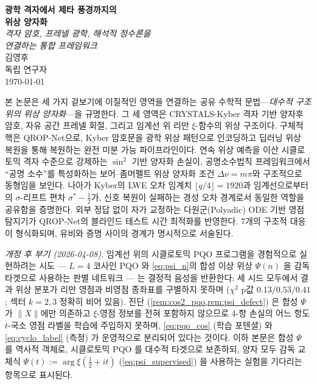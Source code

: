 \documentclass[11pt, a4paper]{article}
\theoremstyle{definition}
\theoremstyle{plain}
\newcommand{\xif}{\xi}
\newcommand{\Psip}{\Psi}
\begin{document}
\begin{center}
  {\LARGE\bfseries 광학 격자에서 제타 풍경까지의\\[4pt]
   위상 양자화}\\[14pt]
  {\large\itshape 격자 암호, 프레넬 광학, 해석적 정수론을\\
   연결하는 통합 프레임워크}\\[20pt]
  {\large 김영후}\\[4pt]
  {\normalsize 독립 연구자}\\[4pt]
  {\small\today}
\end{center}

\vspace{1.5em}

\begin{tcolorbox}[
  colback=lightbg, colframe=zetaviolet!60!black,
  title={\bfseries 초록}, fonttitle=\large,
  arc=3pt, boxrule=0.8pt, toptitle=3pt, bottomtitle=3pt
]
본 논문은 세 가지 겉보기에 이질적인 영역을 연결하는 공유 수학적 문법---\textit{대수적 구조 위의 위상 양자화}---을 규명한다. 그 세 영역은 CRYSTALS-Kyber 격자 기반 양자후 암호, 자유 공간 프레넬 회절, 그리고 임계선 위 리만 $\xif$-함수의 위상 구조이다. 구체적 핵은 QROP-Net으로, Kyber 암호문을 광학 위상 패턴으로 인코딩하고 딥러닝 위상 복원을 통해 복원하는 완전 미분 가능 파이프라인이다. 연속 위상 예측을 이산 시클로토믹 격자 수준으로 강제하는 $\sin^2$ 기반 양자화 손실이, 공명소수법칙 프레임워크에서 ``공명 소수''를 특성화하는 보어--좀머펠트 위상 양자화 조건 $\Delta\nu = m\pi$와 구조적으로 동형임을 보인다. 나아가 Kyber의 LWE 오차 임계치 $\lfloor q/4\rfloor = 1920$과 임계선으로부터의 $\sigma$-리프트 편차 $\sigma^*-\tfrac{1}{2}$가, 신호 복원이 실패하는 경성 오차 경계로서 동일한 역할을 공유함을 증명한다. 외부 정답 없이 자가 교정하는 다원군(Polyadic) ODE 기반 영점 탐지기가 QROP-Net의 블라인드 테스트 시간 최적화를 반영한다. 7개의 구조적 대응이 형식화되며, 유비와 증명 사이의 경계가 명시적으로 서술된다.

\smallskip
\noindent\textit{개정 후 부기 (2026-04-08).} 임계선 위의 시클로토믹 PQO 프로그램을 경험적으로 실현하려는 시도 — $L=4$ 코사인 PQO 와 \cref{eq:psi_n}의 합성 이상 위상 $\Psip(n)$ 을 감독 타겟으로 사용하는 판별 네트워크 — 는 결정적 음성을 반환한다: 세 시드 모두에서 결과 위상 분포가 리만 영점과 비영점 종좌표를 구별하지 못하며 ($\chi^2$ p값 $0.13/0.53/0.41$; 섹터 $k=2,3$ 정확히 비어 있음). 진단 (\cref{rem:cos2_pqo,rem:psi_defect}) 은 합성 $\Psip$ 가 $\|X\|$에만 의존하고 $\xif$-영점 정보를 전혀 포함하지 않으므로 4-항 손실의 어느 항도 $t$-국소 영점 라벨을 학습에 주입하지 못하며, \cref{eq:pqo_cos} (학습 포텐셜) 와 \cref{eq:cyclo_label} (측정) 가 운영적으로 분리되어 있다는 것이다. 이하 본문은 합성 $\Psip$ 를 역사적 객체로, 시클로토믹 PQO 를 대수적 타겟으로 보존하되, 양자 모두 감독 교체식 $\Psip(t) := \arg\xif(\tfrac{1}{2}+it)$ (\cref{eq:psi_supervised}) 을 사용하는 실험을 기다리는 항목으로 표시된다.
\end{tcolorbox}
\end{document}
